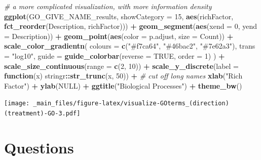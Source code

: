 \documentclass[
]{book}
\newenvironment{Shaded}{\begin{snugshade}}{\end{snugshade}}
\newcommand{\AttributeTok}[1]{\textcolor[rgb]{0.13,0.29,0.53}{#1}}
\newcommand{\CommentTok}[1]{\textcolor[rgb]{0.56,0.35,0.01}{\textit{#1}}}
\newcommand{\ConstantTok}[1]{\textcolor[rgb]{0.56,0.35,0.01}{#1}}
\newcommand{\ControlFlowTok}[1]{\textcolor[rgb]{0.13,0.29,0.53}{\textbf{#1}}}
\newcommand{\DecValTok}[1]{\textcolor[rgb]{0.00,0.00,0.81}{#1}}
\newcommand{\FunctionTok}[1]{\textcolor[rgb]{0.13,0.29,0.53}{\textbf{#1}}}
\newcommand{\NormalTok}[1]{#1}
\newcommand{\SpecialCharTok}[1]{\textcolor[rgb]{0.81,0.36,0.00}{\textbf{#1}}}
\newcommand{\StringTok}[1]{\textcolor[rgb]{0.31,0.60,0.02}{#1}}
\begin{document}
\begin{Shaded}
\begin{Highlighting}[]
\CommentTok{\# a more complicated visualization, with more information density}
\FunctionTok{ggplot}\NormalTok{(GO\_GIVE\_NAME\_results,}
       \AttributeTok{showCategory =} \DecValTok{15}\NormalTok{,}
       \FunctionTok{aes}\NormalTok{(richFactor, }\FunctionTok{fct\_reorder}\NormalTok{(Description, richFactor))) }\SpecialCharTok{+}
  \FunctionTok{geom\_segment}\NormalTok{(}\FunctionTok{aes}\NormalTok{(}\AttributeTok{xend =} \DecValTok{0}\NormalTok{, }\AttributeTok{yend =}\NormalTok{ Description)) }\SpecialCharTok{+}
  \FunctionTok{geom\_point}\NormalTok{(}\FunctionTok{aes}\NormalTok{(}\AttributeTok{color =}\NormalTok{ p.adjust, }\AttributeTok{size =}\NormalTok{ Count)) }\SpecialCharTok{+}
  \FunctionTok{scale\_color\_gradientn}\NormalTok{(}
    \AttributeTok{colours =} \FunctionTok{c}\NormalTok{(}\StringTok{"\#f7ca64"}\NormalTok{, }\StringTok{"\#46bac2"}\NormalTok{, }\StringTok{"\#7e62a3"}\NormalTok{),}
    \AttributeTok{trans =} \StringTok{"log10"}\NormalTok{,}
    \AttributeTok{guide =} \FunctionTok{guide\_colorbar}\NormalTok{(}\AttributeTok{reverse =} \ConstantTok{TRUE}\NormalTok{, }\AttributeTok{order =} \DecValTok{1}\NormalTok{)}
\NormalTok{  ) }\SpecialCharTok{+}
  \FunctionTok{scale\_size\_continuous}\NormalTok{(}\AttributeTok{range =} \FunctionTok{c}\NormalTok{(}\DecValTok{2}\NormalTok{, }\DecValTok{10}\NormalTok{)) }\SpecialCharTok{+}
  \FunctionTok{scale\_y\_discrete}\NormalTok{(}\AttributeTok{label =} \ControlFlowTok{function}\NormalTok{(x) stringr}\SpecialCharTok{::}\FunctionTok{str\_trunc}\NormalTok{(x, }\DecValTok{50}\NormalTok{)) }\SpecialCharTok{+} \CommentTok{\# cut off long names}
  \FunctionTok{xlab}\NormalTok{(}\StringTok{"Rich Factor"}\NormalTok{) }\SpecialCharTok{+}
  \FunctionTok{ylab}\NormalTok{(}\ConstantTok{NULL}\NormalTok{) }\SpecialCharTok{+}
  \FunctionTok{ggtitle}\NormalTok{(}\StringTok{"Biological Processes"}\NormalTok{) }\SpecialCharTok{+}
  \FunctionTok{theme\_bw}\NormalTok{()}
\end{Highlighting}
\end{Shaded}

\texttt{[image: \_main\_files/figure-latex/visualize-GOterms\_(direction)(treatment)-GO-3.pdf]}

\hypertarget{questions}{%
\section{Questions}\label{questions}}
\end{document}
